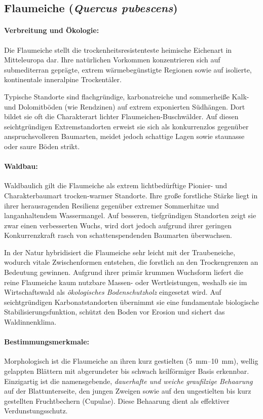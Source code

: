 \documentclass[twocolumn, bibliography=totoc, abstract=true]{scrartcl}
\begin{document}
\subsection{Flaumeiche (\textit{Quercus pubescens})}

\paragraph{Verbreitung und Ökologie:}
Die Flaumeiche stellt die trockenheitsresistenteste heimische Eichenart in Mitteleuropa dar. Ihre natürlichen Vorkommen konzentrieren sich auf submediterran geprägte, extrem wärmebegünstigte Regionen sowie auf isolierte, kontinentale inneralpine Trockentäler. 

Typische Standorte sind flachgründige, karbonatreiche und sommerheiße Kalk- und Dolomitböden (wie Rendzinen) auf extrem exponierten Südhängen. Dort bildet sie oft die Charakterart lichter Flaumeichen-Buschwälder. Auf diesen seichtgründigen Extremstandorten erweist sie sich als konkurrenzlos gegenüber anspruchsvolleren Baumarten, meidet jedoch schattige Lagen sowie staunasse oder saure Böden strikt.

\paragraph{Waldbau:}
Waldbaulich gilt die Flaumeiche als extrem lichtbedürftige Pionier- und Charakterbaumart trocken-warmer Standorte. Ihre große forstliche Stärke liegt in ihrer herausragenden Resilienz gegenüber extremer Sommerhitze und langanhaltendem Wassermangel. Auf besseren, tiefgründigen Standorten zeigt sie zwar einen verbesserten Wuchs, wird dort jedoch aufgrund ihrer geringen Konkurrenzkraft rasch von schattenspendenden Baumarten überwachsen. 

In der Natur hybridisiert die Flaumeiche sehr leicht mit der Traubeneiche, wodurch vitale Zwischenformen entstehen, die forstlich an den Trockengrenzen an Bedeutung gewinnen. Aufgrund ihrer primär krummen Wuchsform liefert die reine Flaumeiche kaum nutzbare Massen- oder Wertleistungen, weshalb sie im Wirtschaftswald als \emph{ökologisches Bodenschutzholz} eingesetzt wird. Auf seichtgründigen Karbonatstandorten übernimmt sie eine fundamentale biologische Stabilisierungsfunktion, schützt den Boden vor Erosion und sichert das Waldinnenklima.

\paragraph{Bestimmungsmerkmale:}
Morphologisch ist die Flaumeiche an ihren kurz gestielten (\qtyrange{5}{10}{\mm}), wellig gelappten Blättern mit abgerundeter bis schwach keilförmiger Basis erkennbar. Einzigartig ist die namensgebende, \emph{dauerhafte und weiche graufilzige Behaarung} auf der Blattunterseite, den jungen Zweigen sowie auf den ungestielten bis kurz gestellten Fruchtbechern (Cupulae). Diese Behaarung dient als effektiver Verdunstungsschutz. 
\end{document}
